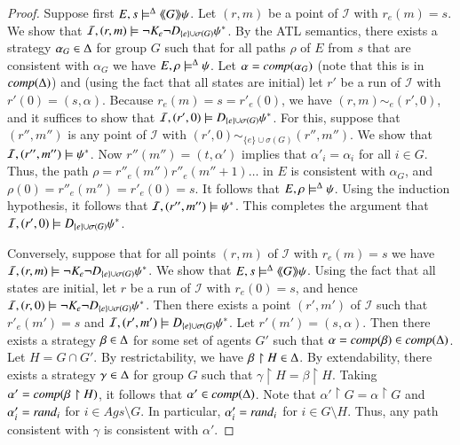 \documentclass[a4wide]{article}
\theoremstyle{examplesty}
\newcommand{\strat}{\sigma}
\newcommand{\Ags}{\mathit{Ags}}
\newcommand{\I}{\mathcal{I}}
\newcommand{\atlop}[1]{\langle\hspace{-2pt}\langle #1 \rangle \hspace{-2pt}\rangle }
\newcommand{\Env}{E}
\newcommand{\restrict}{\upharpoonright}
\newcommand{\sgy}{\alpha}
\begin{document}
\begin{proof}
Suppose first $\Env, s \models^\GStrats \atlop{G} \psi$. 
Let $(r,m)$ be a point of $\I$ with $r_e(m) =s$. 
We show that 
$\I, (r,m)\models \neg K_e \neg D_{\{e\} \cup \strat(G)}   \trl{\psi}$. 
By the ATL semantics, there exists a strategy $\sgy_G\in \GStrats$ for group $G$ such that for all paths $\rho$ of $\Env$ from $s$ that are consistent with $\sgy_G$ we have 
$\Env, \rho \models^\GStrats \psi$. Let $\sgy = \compl{\sgy_G}$ (note that this is in $ \mathit{comp}(\Delta)$) 
and 
(using the fact that all states are initial)
let $r'$ be a run of $\I$ with 
$r'(0) = (s,\sgy)$.  
Because 
$r_e(m) = s = r'_e(0)$, we have $(r,m) \sim_e (r',0)$,  and it suffices 
to show that $\I, (r',0)\models  D_{\{e\} \cup \strat(G)}  \trl{\psi}$. 
For this, suppose that $(r'',m'')$ is 
any 
point of $\I$ 
with $(r',0) \sim_{\{e\} \cup \strat(G)} (r'',m'')$. 
We show that $\I, (r'',m'')\models   \trl{\psi}$. 
Now $r''(m'') = (t, \sgy')$ implies that $\sgy'_i = \sgy_i$ for all $i \in G$. 
Thus, the path $\rho = r''_e(m'') r''_e(m''+1) \ldots$ in $\Env$ is consistent with $\sgy_G$, 
and 
$\rho(0) = r''_e(m'') = r'_e(0)  = s$. 
It follows that 
$\Env, \rho  \models^\GStrats \psi$.
Using the induction hypothesis, it follows that 
$\I, (r'',m'')\models   \trl{\psi}$. 
This completes the argument that $\I, (r',0)\models  D_{\{e\} \cup \strat(G)}  \trl{\psi}$. 



Conversely, suppose that  for all  points $(r,m)$ of  $\I$ with $r_e(m) = s$ we have $\I, (r,m)\models \neg K_e \neg D_{\{e\} \cup \strat(G)}  \trl{\psi}$. 
We show that $\Env, s \models^\GStrats \atlop{G} \psi$. 
Using the fact that all states are initial, let $r$ be a run of $\I$ with  $r_e(0) = s$, and 
hence $\I, (r,0)\models \neg K_e \neg D_{\{e\} \cup \strat(G)}  \trl{\psi}$.  
Then there exists a point $(r',m')$ of $\I$ such that $r'_e(m')  = s$ and 
$\I, (r',m')\models  D_{\{e\} \cup \strat(G)}  \trl{\psi}$. 
Let $r'(m') = (s,\sgy)$. Then 
there exists a strategy $\beta\in \Delta$ for some set of agents $G'$ such that 
$\sgy = \compl{\beta}\in  \compl{\GStrats}$. 
Let $H = G\cap G'$. By restrictability, 
we have $\beta\restrict H \in \GStrats$. 
By extendability, there exists a strategy $\gamma \in \Delta$ for group $G$ 
such that $\gamma \restrict H = \beta \restrict H$.  
Taking $\sgy' = \compl{\beta\restrict H}$, it follows that $\sgy' \in \compl{\GStrats}$. 
Note that $\sgy' \restrict G = \sgy\restrict G$ and $\sgy'_i = \rand_i$ for $i \in \Ags \setminus G$.  
In particular, $\sgy'_i = \rand_i$ for $i \in G \setminus  H$. Thus, 
any path consistent with $\gamma$ is consistent with $\sgy'$.  


\end{proof}
\end{document}
